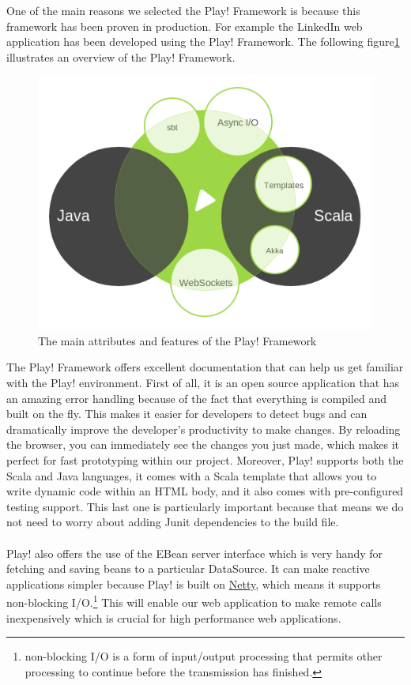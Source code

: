 One of the main reasons we selected the Play! Framework is because this framework has been proven in production. For example the LinkedIn web application has been developed using the Play! Framework. The following figure\ref{play} illustrates an overview of the Play! Framework.\\
\begin{figure}[h!]
\centering
\includegraphics[scale=0.5]{./img/play.png}
\caption{\small{The main attributes and features of the Play! Framework}}
\label{play}
\end{figure}
 
 
The Play! Framework offers excellent documentation\cite{playDoc} that can help us get familiar with the Play! environment. First of all, it is an open source application that has an amazing error handling because of the fact that everything is compiled and built on the fly. This makes it easier for developers to detect bugs and can dramatically improve the developer's productivity to make changes. By reloading the browser, you can immediately see the changes you just made, which makes it perfect for fast prototyping within our project. Moreover, Play! supports both the Scala and Java languages, it comes with a Scala template that allows you to write dynamic code within an HTML body, and it also comes with pre-configured testing support. This last one is particularly important because that means we do not need to worry about adding Junit dependencies to the build file. \\\\
Play! also offers the use of the EBean server interface which is very handy for fetching and saving beans to a particular DataSource. It can make reactive applications simpler because Play! is built on \href{http://netty.io/}{Netty}, which means it supports non-blocking I/O.\footnote{ non-blocking I/O is a form of input/output processing that permits other processing to continue before the transmission has finished.} This will enable our web application to make remote calls inexpensively which is crucial for high performance web applications.

\newpage




